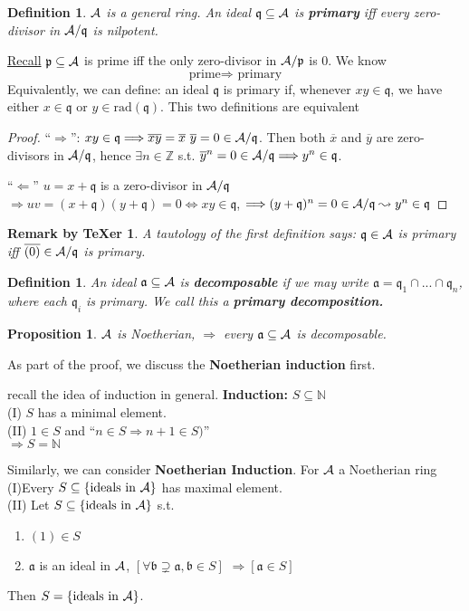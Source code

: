 \documentclass[11pt]{article}
\newtheorem{prop}[thm]{Proposition}
\newtheorem{dfn}[thm]{Definition}
\newtheorem{rmkt}[thm]{Remark by TeXer}
\newcommand{\intg}{\mathbb Z}
\newcommand{\sca}{{\mathfrak a}}
\newcommand{\scb}{{\mathfrak b}}
\newcommand{\scp}{{\mathfrak p}}
\newcommand{\scq}{\mathfrak q}
\newcommand{\cala}{{\cal A}}
\newcommand{\Lrta}{\Longrightarrow}
\newcommand{\Llta}{\Longleftarrow}
\newcommand{\Llrta}{\Longleftrightarrow}
\begin{document}
\begin{dfn}$\cala$ is a general ring. 
An ideal $\scq\subseteq\cala$ is \textbf{primary} iff every zero-divisor  in $\cala/\scq$ is nilpotent.
\end{dfn}
\underline{Recall} $\scp\subseteq\cala$ is prime iff the only zero-divisor  in $\cala/\scp$ is $0$. We know
$$
\text{prime}\Lrta\text{ primary}
$$
Equivalently, we can define: an ideal $\scq$ is primary if, whenever $xy\in\scq$, we have either $x\in\scq$ or $y\in \text{rad}(\scq)$. This two definitions are equivalent
\begin{proof}
``$\Lrta$'': $xy\in\scq\Lrta \overline{xy}=\overline{x}\ \overline{y}=0\in \cala/\scq $. Then both $\overline{x}$ and $\overline{y}$ are zero-divisors  in $\cala/\scq$, hence $\exists n\in\intg$ s.t. ${\overline{y}}^n=0\in \cala/\scq\Lrta y^n\in\scq$.

``$\Llta$'' $u=x+\scq$ is a zero-divisor  in $\cala/\scq$ $\Lrta uv=(x+\scq)(y+\scq)=0\Llrta xy\in\scq$, $\Lrta (y+\scq)^n=0\in\cala/\scq\leadsto y^n\in\scq$
\end{proof}
\begin{rmkt}
A tautology of the first definition says: $\scq\in\cala$ is primary iff $\overline{(0)}\in\cala/\scq$ is primary.
\end{rmkt}
\begin{dfn}
An ideal $\sca\subseteq \cala$ is \textbf{decomposable} if we may write $\sca=\scq_1\cap...\cap \scq_n$, where each $\scq_i$ is primary. We call this a \textbf{primary decomposition.}
\end{dfn}
\begin{prop}
$\cala$ is Noetherian, $\Lrta$ every $\sca\subseteq \cala$ is decomposable. 
\end{prop}
As part of the proof, we discuss the \textbf{Noetherian induction} first.

recall the idea of induction in general.
\textbf{Induction:} $S\subseteq \mathbb{N}$\\
(I) $S$ has a minimal element.\\
(II) $1\in S$ and ``$n\in S\Lrta n+1\in S)$''\\
 $\Lrta S=\mathbb{N}$

Similarly, we can consider 
\textbf{Noetherian Induction}. For $\cala$ a Noetherian ring\\
(I)Every $S\subseteq\{\text{ideals in $\cala$}\}$  has maximal element.
\\
(II) Let $S\subseteq\{\text{ideals in $\cala$}\}$ s.t.
\begin{enumerate}[label=(\alph*)]
\item $(1)\in S$
\item $\sca$ is an ideal in $\cala$,  $[\forall \scb\supsetneq\sca, \scb\in S]$ $\Lrta [\sca\in S]$\\
\end{enumerate}
Then $S=\{\text{ideals in $\cala$}\}$.
\end{document}
